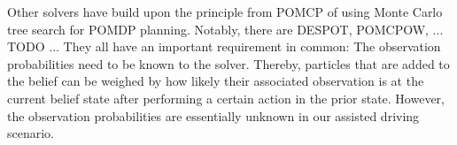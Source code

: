 







Other solvers have build upon the principle from POMCP of using Monte Carlo tree search for POMDP planning. 
Notably, there are DESPOT, POMCPOW, ... TODO ...
They all have an important requirement in common: The observation probabilities need to be known to the solver. Thereby, particles that are added to the belief can be weighed by how likely their associated observation is at the current belief state after performing a certain action in the prior state. However, the observation probabilities are essentially unknown in our assisted driving scenario. 

